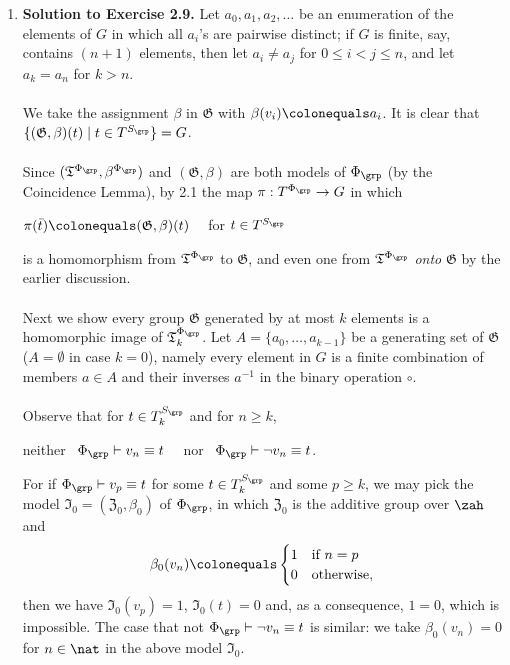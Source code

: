 \begin{enumerate}[1.]
%
\item \textbf{Solution to Exercise 2.9.} Let $a_0, a_1, a_2, \ldots$ be an enumeration of the elements of $G$ in which all $a_i$'s are pairwise distinct; if $G$ is finite, say, contains $(n + 1)$ elements, then let $a_i \neq a_j$ for $0 \leq i < j \leq n$, and let $a_k = a_n$ for $k > n$.\\
\ \\
We take the assignment $\beta$ in $\mathfrak{G}$ with $\beta (v_i) \colonequals a_i$. It is clear that $\{ (\mathfrak{G}, \beta)(t) \mid t \in T^{S_\grp} \} = G$.\\
\ \\
Since $(\mathfrak{T}^{\Phi_\grp}, \beta^{\Phi_\grp})$ and $(\mathfrak{G}, \beta)$ are both models of $\Phi_\grp$ (by the Coincidence Lemma), by 2.1 the map $\pi: T^{\Phi_\grp} \to G$ in which
\begin{center}
$\pi (\bar{t}) \colonequals (\mathfrak{G}, \beta)(t)$ \ \ for $t \in T^{S_\grp}$
\end{center}
is a homomorphism from $\mathfrak{T}^{\Phi_\grp}$ to $\mathfrak{G}$, and even one from $\mathfrak{T}^{\Phi_\grp}$ \emph{onto} $\mathfrak{G}$ by the earlier discussion.\\
\ \\
Next we show every group $\mathfrak{G}$ generated by at most $k$ elements is a homomorphic image of $\mathfrak{T}_k^{\Phi_\grp}$. Let $A = \{ a_0, \ldots, a_{k - 1} \}$ be a generating set of $\mathfrak{G}$ ($A = \emptyset$ in case $k = 0$), namely every element in $G$ is a finite combination of members $a \in A$ and their inverses $a^{-1}$ in the binary operation $\circ$.\\
\ \\
Observe that for $t \in T_k^{S_\grp}$ and for $n \geq k$,
\begin{center}
neither \ $\Phi_\grp \vdash v_n \equiv t$ \ \ nor \ $\Phi_\grp \vdash \neg v_n \equiv t$.
\end{center}
For if $\Phi_\grp \vdash v_p \equiv t$ for some $t \in T_k^{S_\grp}$ and some $p \geq k$, we may pick the model $\mathfrak{I}_0 = (\mathfrak{Z}_0, \beta_0)$ of $\Phi_\grp$, in which $\mathfrak{Z}_0$ is the additive group over $\zah$ and
\[
\beta_0 (v_n) \colonequals \begin{cases}
1 & \mbox{if \(n = p\)} \cr
0 & \mbox{otherwise},
\end{cases}
\]
then we have $\mathfrak{I}_0 (v_p) = 1$, $\mathfrak{I}_0 (t) = 0$ and, as a consequence, $1 = 0$, which is impossible. The case that not $\Phi_\grp \vdash \neg v_n \equiv t$ is similar: we take $\beta_0 (v_n) = 0$ for $n \in \nat$ in the above model $\mathfrak{I}_0$.\\

\end{enumerate}
